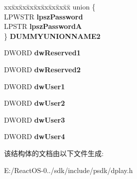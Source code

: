 \begin{DoxyCompactItemize}
\begin{tabbing}
\end{tabbing}\item 
\mbox{\label{structtag_d_p_s_e_s_s_i_o_n_d_e_s_c2_ac2bfe48ac1261d37d9bf18ce4dac3e4c}} 
\begin{tabbing}
xx\=xx\=xx\=xx\=xx\=xx\=xx\=xx\=xx\=\kill
union \{\\
\>LPWSTR {\bfseries lpszPassword}\\
\>LPSTR {\bfseries lpszPasswordA}\\
\} {\bfseries DUMMYUNIONNAME2}\\

\end{tabbing}\item 
\mbox{\label{structtag_d_p_s_e_s_s_i_o_n_d_e_s_c2_a9de168f9b4d39cf0d2915c5475ca48be}} 
D\+W\+O\+RD {\bfseries dw\+Reserved1}
\item 
\mbox{\label{structtag_d_p_s_e_s_s_i_o_n_d_e_s_c2_a65b364a75d545559b4293b09d292f4c9}} 
D\+W\+O\+RD {\bfseries dw\+Reserved2}
\item 
\mbox{\label{structtag_d_p_s_e_s_s_i_o_n_d_e_s_c2_a23974d8798ab49dbe4e09a239add38b5}} 
D\+W\+O\+RD {\bfseries dw\+User1}
\item 
\mbox{\label{structtag_d_p_s_e_s_s_i_o_n_d_e_s_c2_a01a258687b4d1143f4d88209bb5fc6a0}} 
D\+W\+O\+RD {\bfseries dw\+User2}
\item 
\mbox{\label{structtag_d_p_s_e_s_s_i_o_n_d_e_s_c2_a4dacccee1a3d6175f03f406f2c2192fb}} 
D\+W\+O\+RD {\bfseries dw\+User3}
\item 
\mbox{\label{structtag_d_p_s_e_s_s_i_o_n_d_e_s_c2_aad26696d1b26305ff0510ad7a58e34cd}} 
D\+W\+O\+RD {\bfseries dw\+User4}
\end{DoxyCompactItemize}


该结构体的文档由以下文件生成\+:\begin{DoxyCompactItemize}
\item 
E\+:/\+React\+O\+S-\/0../sdk/include/psdk/dplay.\+h\end{DoxyCompactItemize}
